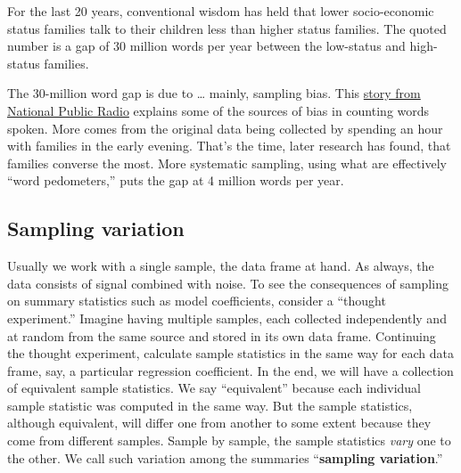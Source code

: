 \documentclass[
  letterpaper,
  DIV=11,
  numbers=noendperiod,
  oneside]{scrartcl}
\begin{document}
\begin{tcolorbox}[enhanced jigsaw, colbacktitle=quarto-callout-note-color!10!white, opacityback=0, breakable, opacitybacktitle=0.6, colback=white, coltitle=black, arc=.35mm, title=\textcolor{quarto-callout-note-color}{\faInfo}\hspace{0.5em}{Sampling bias and the ``30-million word gap''}, left=2mm, colframe=quarto-callout-note-color-frame, rightrule=.15mm, bottomrule=.15mm, leftrule=.75mm, bottomtitle=1mm, toptitle=1mm, titlerule=0mm, toprule=.15mm]

For the last 20 years, conventional wisdom has held that lower
socio-economic status families talk to their children less than higher
status families. The quoted number is a gap of 30 million words per year
between the low-status and high-status families.

The 30-million word gap is due to \ldots{} mainly, sampling bias. This
\href{https://www.npr.org/sections/ed/2018/06/01/615188051/lets-stop-talking-about-the-30-million-word-gap}{story
from National Public Radio} explains some of the sources of bias in
counting words spoken. More comes from the original data being collected
by spending an hour with families in the early evening. That's the time,
later research has found, that families converse the most. More
systematic sampling, using what are effectively ``word pedometers,''
puts the gap at 4 million words per year.

\end{tcolorbox}

\subsection{Sampling variation}\label{sampling-variation}

Usually we work with a single sample, the data frame at hand. As always,
the data consists of signal combined with noise. To see the consequences
of sampling on summary statistics such as model coefficients, consider a
``thought experiment.'' Imagine having multiple samples, each collected
independently and at random from the same source and stored in its own
data frame. Continuing the thought experiment, calculate sample
statistics in the same way for each data frame, say, a particular
regression coefficient. In the end, we will have a collection of
equivalent sample statistics. We say ``equivalent'' because each
individual sample statistic was computed in the same way. But the sample
statistics, although equivalent, will differ one from another to some
extent because they come from different samples. Sample by sample, the
sample statistics \emph{vary} one to the other. We call such variation
among the summaries ``\textbf{sampling variation}.''
\end{document}
